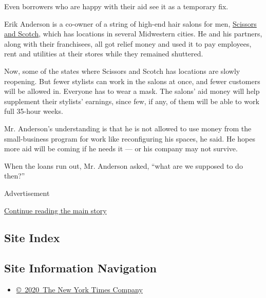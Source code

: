Even borrowers who are happy with their aid see it as a temporary fix.

Erik Anderson is a co-owner of a string of high-end hair salons for men,
\href{https://www.scissorsscotch.com/\#scissors-scotch}{Scissors and
Scotch}, which has locations in several Midwestern cities. He and his
partners, along with their franchisees, all got relief money and used it
to pay employees, rent and utilities at their stores while they remained
shuttered.

Now, some of the states where Scissors and Scotch has locations are
slowly reopening. But fewer stylists can work in the salons at once, and
fewer customers will be allowed in. Everyone has to wear a mask. The
salons' aid money will help supplement their stylists' earnings, since
few, if any, of them will be able to work full 35-hour weeks.

Mr. Anderson's understanding is that he is not allowed to use money from
the small-business program for work like reconfiguring his spaces, he
said. He hopes more aid will be coming if he needs it --- or his company
may not survive.

When the loans run out, Mr. Anderson asked, ``what are we supposed to do
then?''

Advertisement

\protect\hyperlink{after-bottom}{Continue reading the main story}

\hypertarget{site-index}{%
\subsection{Site Index}\label{site-index}}

\hypertarget{site-information-navigation}{%
\subsection{Site Information
Navigation}\label{site-information-navigation}}

\begin{itemize}
\tightlist
\item
  \href{https://help.nytimes3xbfgragh.onion/hc/en-us/articles/115014792127-Copyright-notice}{©~2020~The
  New York Times Company}
\end{itemize}

